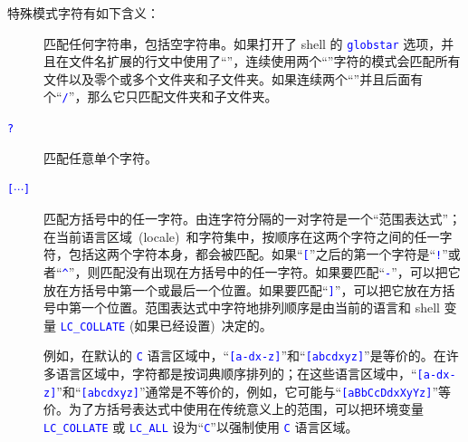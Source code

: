 \documentclass[openany,notitlepage]{book}
\newcommand{\code}[1]{\textcolor{blue}{{\tt #1}}}
\begin{document}
\begin{CJK}{UTF8}{song}
特殊模式字符有如下含义：
\begin{description}
    \item[\code{*}]
    匹配任何字符串，包括空字符串。如果打开了 shell 的 \code{globstar} 选项，并且在文件名扩展的行文中使用了``\code{*}''，连续使用两个``\code{*}''字符的模式会匹配所有文件以及零个或多个文件夹和子文件夹。如果连续两个``\code{*}''并且后面有个``\code{/}''，那么它只匹配文件夹和子文件夹。

    \item[\code{?}]
    匹配任意单个字符。

    \item[\code{[$\cdots$]}]
    匹配方括号中的任一字符。由连字符分隔的一对字符是一个``范围表达式''；在当前语言区域~(locale)~和字符集中，按顺序在这两个字符之间的任一字符，包括这两个字符本身，都会被匹配。如果``\code{[}''之后的第一个字符是``\code{!}''或者``\code{\textasciicircum}''，则匹配没有出现在方括号中的任一字符。如果要匹配``\code{-}''，可以把它放在方括号中第一个或最后一个位置。如果要匹配``\code{]}''，可以把它放在方括号中第一个位置。范围表达式中字符地排列顺序是由当前的语言和 shell 变量 \code{LC\_COLLATE} (如果已经设置)~决定的。

    例如，在默认的 \code{C} 语言区域中，``\code{[a-dx-z]}''和``\code{[abcdxyz]}''是等价的。在许多语言区域中，字符都是按词典顺序排列的；在这些语言区域中，``\code{[a-dx-z]}''和``\code{[abcdxyz]}''通常是不等价的，例如，它可能与``\code{[aBbCcDdxXyYz]}''等价。为了方括号表达式中使用在传统意义上的范围，可以把环境变量 \code{LC\_COLLATE} 或 \code{LC\_ALL} 设为``\code{C}''以强制使用 \code{C} 语言区域。


\end{description}
\end{CJK}
\end{document}
